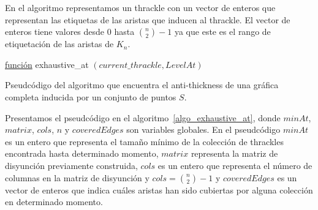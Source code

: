   En el algoritmo representamos un thrackle con un vector de enteros que representan las etiquetas de las
  aristas que inducen al thrackle. El vector de enteros tiene valores desde $0$ hasta $\binom{n}{2}-1$ ya que este es el rango de etiquetación de las aristas de $K_n$.
  \begin{algorithm}[p]
    \DontPrintSemicolon
    \underline{función} exhaustive\_at $ (current\_thrackle,LevelAt) $\;
    \caption{Pseudcódigo del algoritmo que encuentra el anti-thickness de una gráfica completa inducida por
    un conjunto de puntos $S$.}
    \label{algo_exhaustive_at}
  \end{algorithm}

  Presentamos el pseudcódigo en el algoritmo~\ref{algo_exhaustive_at}, donde
  $minAt$, $matrix$, $cols$, $n$ y $coveredEdges$ son variables globales. En el pseudcódigo $minAt$ es un
  entero que representa el tamaño mínimo de la colección de thrackles encontrada hasta determinado momento,
  $matrix$ representa la matriz de disyunción previamente construida, $cols$ es un entero que representa el
  número de columnas en la matriz de disyunción y $cols=\binom{n}{2}-1$ y $coveredEdges$ es un vector de
  enteros que indica cuáles aristas han sido cubiertas por alguna colección en determinado momento.

